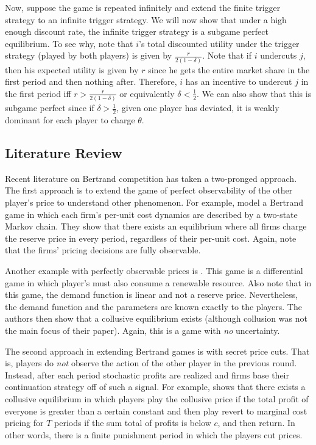 \documentclass{article}
\begin{document}
Now, suppose the game is repeated infinitely and extend the finite
trigger strategy to an infinite trigger strategy.  We will now show
that under a high enough discount rate, the infinite trigger strategy
is a subgame perfect equilibrium.  To see why, note that $i$'s total
discounted utility under the trigger strategy (played by both players)
is given by $\frac{r}{2(1-\delta)}$.  Note that if $i$ undercuts $j$,
then his expected utility is given by $r$ since he gets the entire
market share in the first period and then nothing after.  Therefore,
$i$ has an incentive to undercut $j$ in the first period iff
$r>\frac{r}{2(1-\delta)}$ or equivalently $\delta<\frac{1}{2}$.  We
can also show that this is subgame perfect since if
$\delta>\frac{1}{2}$, given one player has deviated, it is weakly
dominant for each player to charge $\theta$. 

\subsection{Literature Review}
Recent literature on Bertrand competition has taken a two-pronged
approach.  The first approach is to extend the game of perfect
observability of the other player's price to understand other
phenomenon.  For example, \cite{AB} model a Bertrand game in which
each firm's per-unit cost dynamics are described by a two-state Markov
chain.  They show that there exists an equilibrium  where all
firms charge the reserve price in every period, regardless of their
per-unit cost.  Again, note that the firms' pricing decisions are
fully observable.

Another example with perfectly observable prices is
\cite{differentialresource}.  This game is a differential game in
which player's must also consume a renewable resource.  Also note that
in this game, the demand function is linear and not a reserve price.
Nevertheless, the demand function and the parameters are known exactly
to the players.  The authors then show that a collusive equilibrium
exists (although collusion was not the main focus of their paper).
Again, this is a game with \emph{no} uncertainty.

The second approach in extending Bertrand games is with secret price
cuts.  That is, players do \emph{not} observe the action of the other
player in the previous round.  Instead, after each period stochastic
profits are realized and firms base their continuation strategy off of
such a signal.  For example, \cite{greenold} shows that there exists a
collusive equilibrium in which players play the collusive price if the
total profit of everyone is greater than a certain constant and then
play revert to marginal cost pricing for $T$ periods if the sum total
of profits is below $c$, and then return.  In other words, there is a
finite punishment period in which the players cut prices.  
\end{document}

